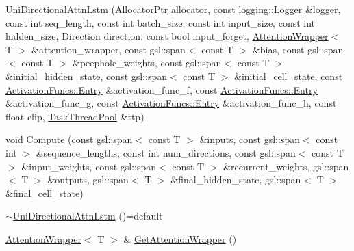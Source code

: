 \begin{DoxyCompactItemize}
\item 
\mbox{\hyperlink{classonnxruntime_1_1contrib_1_1rnn_1_1detail_1_1UniDirectionalAttnLstm_a4366e877a3cb2febd29550d5bc93f9ae}{Uni\+Directional\+Attn\+Lstm}} (\mbox{\hyperlink{namespaceonnxruntime_a6cdac724c5dcefded3a63f08dae58fda}{Allocator\+Ptr}} allocator, const \mbox{\hyperlink{classonnxruntime_1_1logging_1_1Logger}{logging\+::\+Logger}} \&logger, const int seq\+\_\+length, const int batch\+\_\+size, const int input\+\_\+size, const int hidden\+\_\+size, Direction direction, const bool input\+\_\+forget, \mbox{\hyperlink{classonnxruntime_1_1contrib_1_1AttentionWrapper}{Attention\+Wrapper}}$<$ T $>$ \&attention\+\_\+wrapper, const gsl\+::span$<$ const T $>$ \&bias, const gsl\+::span$<$ const T $>$ \&peephole\+\_\+weights, const gsl\+::span$<$ const T $>$ \&initial\+\_\+hidden\+\_\+state, const gsl\+::span$<$ const T $>$ \&initial\+\_\+cell\+\_\+state, const \mbox{\hyperlink{structonnxruntime_1_1rnn_1_1detail_1_1ActivationFuncs_1_1Entry}{Activation\+Funcs\+::\+Entry}} \&activation\+\_\+func\+\_\+f, const \mbox{\hyperlink{structonnxruntime_1_1rnn_1_1detail_1_1ActivationFuncs_1_1Entry}{Activation\+Funcs\+::\+Entry}} \&activation\+\_\+func\+\_\+g, const \mbox{\hyperlink{structonnxruntime_1_1rnn_1_1detail_1_1ActivationFuncs_1_1Entry}{Activation\+Funcs\+::\+Entry}} \&activation\+\_\+func\+\_\+h, const float clip, \mbox{\hyperlink{classonnxruntime_1_1TaskThreadPool}{Task\+Thread\+Pool}} \&ttp)
\item 
\mbox{\hyperlink{mlasi_8h_a88f941d423cb2a819b70a1358982b1a6}{void}} \mbox{\hyperlink{classonnxruntime_1_1contrib_1_1rnn_1_1detail_1_1UniDirectionalAttnLstm_ad0dee12c0610b82a3d0af32da1ec3ac8}{Compute}} (const gsl\+::span$<$ const T $>$ \&inputs, const gsl\+::span$<$ const int $>$ \&sequence\+\_\+lengths, const int num\+\_\+directions, const gsl\+::span$<$ const T $>$ \&input\+\_\+weights, const gsl\+::span$<$ const T $>$ \&recurrent\+\_\+weights, gsl\+::span$<$ T $>$ \&outputs, gsl\+::span$<$ T $>$ \&final\+\_\+hidden\+\_\+state, gsl\+::span$<$ T $>$ \&final\+\_\+cell\+\_\+state)
\item 
\mbox{\hyperlink{classonnxruntime_1_1contrib_1_1rnn_1_1detail_1_1UniDirectionalAttnLstm_a9c6fd872601da10b0adabdcc4a6346d4}{$\sim$\+Uni\+Directional\+Attn\+Lstm}} ()=default
\item 
\mbox{\hyperlink{classonnxruntime_1_1contrib_1_1AttentionWrapper}{Attention\+Wrapper}}$<$ T $>$ \& \mbox{\hyperlink{classonnxruntime_1_1contrib_1_1rnn_1_1detail_1_1UniDirectionalAttnLstm_afa2e0511cc65d7bdcb3e4d67c3829959}{Get\+Attention\+Wrapper}} ()
\end{DoxyCompactItemize}


